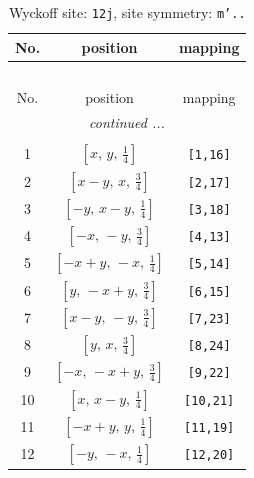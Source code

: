 \documentclass[fleqn,8pt]{jsarticle}
\begin{document}
\begin{longtable}{ccc}
\caption{Wyckoff site: {\tt 12j}, site symmetry: {\tt m'..}}
 \\
 \hline \hline
No. & position & mapping \\ \hline \endfirsthead

\multicolumn{2}{l}{\tablename\ \thetable{}} \\
 \hline \hline
No. & position & mapping \\ \hline \endhead

 \hline \hline
\multicolumn{2}{r}{\footnotesize\it continued ...} \\ \endfoot

 \hline \hline
\multicolumn{2}{r}{} \\ \endlastfoot

1 & $\left[ x,\, y,\, \frac{1}{4} \right]$ & {\tt [1,16]} \\ \hline
2 & $\left[ x - y,\, x,\, \frac{3}{4} \right]$ & {\tt [2,17]} \\ \hline
3 & $\left[ - y,\, x - y,\, \frac{1}{4} \right]$ & {\tt [3,18]} \\ \hline
4 & $\left[ - x,\, - y,\, \frac{3}{4} \right]$ & {\tt [4,13]} \\ \hline
5 & $\left[ - x + y,\, - x,\, \frac{1}{4} \right]$ & {\tt [5,14]} \\ \hline
6 & $\left[ y,\, - x + y,\, \frac{3}{4} \right]$ & {\tt [6,15]} \\ \hline
7 & $\left[ x - y,\, - y,\, \frac{3}{4} \right]$ & {\tt [7,23]} \\ \hline
8 & $\left[ y,\, x,\, \frac{3}{4} \right]$ & {\tt [8,24]} \\ \hline
9 & $\left[ - x,\, - x + y,\, \frac{3}{4} \right]$ & {\tt [9,22]} \\ \hline
10 & $\left[ x,\, x - y,\, \frac{1}{4} \right]$ & {\tt [10,21]} \\ \hline
11 & $\left[ - x + y,\, y,\, \frac{1}{4} \right]$ & {\tt [11,19]} \\ \hline
12 & $\left[ - y,\, - x,\, \frac{1}{4} \right]$ & {\tt [12,20]} \\
\end{longtable}
\renewcommand{\arraystretch}{1.2}
\end{document}
